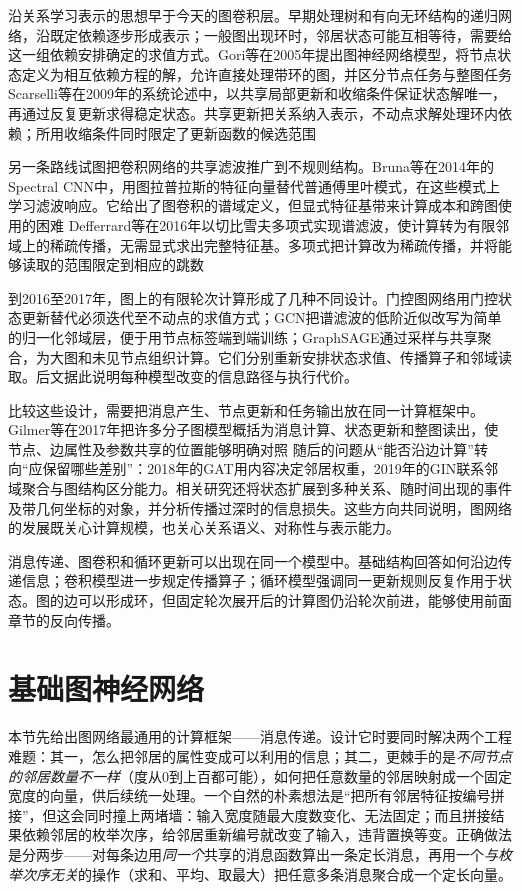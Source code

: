 沿关系学习表示的思想早于今天的图卷积层。早期处理树和有向无环结构的递归网络，沿既定依赖逐步形成表示；一般图出现环时，邻居状态可能互相等待，需要给这一组依赖安排确定的求值方式。Gori等在2005年提出图神经网络模型，将节点状态定义为相互依赖方程的解，允许直接处理带环的图，并区分节点任务与整图任务 Scarselli等在2009年的系统论述中，以共享局部更新和收缩条件保证状态解唯一，再通过反复更新求得稳定状态。共享更新把关系纳入表示，不动点求解处理环内依赖；所用收缩条件同时限定了更新函数的候选范围

另一条路线试图把卷积网络的共享滤波推广到不规则结构。Bruna等在2014年的Spectral CNN中，用图拉普拉斯的特征向量替代普通傅里叶模式，在这些模式上学习滤波响应。它给出了图卷积的谱域定义，但显式特征基带来计算成本和跨图使用的困难 Defferrard等在2016年以切比雪夫多项式实现谱滤波，使计算转为有限邻域上的稀疏传播，无需显式求出完整特征基。多项式把计算改为稀疏传播，并将能够读取的范围限定到相应的跳数

到2016至2017年，图上的有限轮次计算形成了几种不同设计。门控图网络用门控状态更新替代必须迭代至不动点的求值方式；GCN把谱滤波的低阶近似改写为简单的归一化邻域层，便于用节点标签端到端训练；GraphSAGE通过采样与共享聚合，为大图和未见节点组织计算。它们分别重新安排状态求值、传播算子和邻域读取。后文据此说明每种模型改变的信息路径与执行代价。

比较这些设计，需要把消息产生、节点更新和任务输出放在同一计算框架中。Gilmer等在2017年把许多分子图模型概括为消息计算、状态更新和整图读出，使节点、边属性及参数共享的位置能够明确对照 随后的问题从“能否沿边计算”转向“应保留哪些差别”：2018年的GAT用内容决定邻居权重，2019年的GIN联系邻域聚合与图结构区分能力。相关研究还将状态扩展到多种关系、随时间出现的事件及带几何坐标的对象，并分析传播过深时的信息损失。这些方向共同说明，图网络的发展既关心计算规模，也关心关系语义、对称性与表示能力。

消息传递、图卷积和循环更新可以出现在同一个模型中。基础结构回答如何沿边传递信息；卷积模型进一步规定传播算子；循环模型强调同一更新规则反复作用于状态。图的边可以形成环，但固定轮次展开后的计算图仍沿轮次前进，能够使用前面章节的反向传播。

\section{基础图神经网络}
\label{sec:gnn-basic}

本节先给出图网络最通用的计算框架——消息传递。设计它时要同时解决两个工程难题：其一，怎么把邻居的属性变成可以利用的信息；其二，更棘手的是\emph{不同节点的邻居数量不一样}（度从0到上百都可能），如何把任意数量的邻居映射成一个固定宽度的向量，供后续统一处理。一个自然的朴素想法是“把所有邻居特征按编号拼接”，但这会同时撞上两堵墙：输入宽度随最大度数变化、无法固定；而且拼接结果依赖邻居的枚举次序，给邻居重新编号就改变了输入，违背置换等变。正确做法是分两步——对每条边用\emph{同一个}共享的消息函数算出一条定长消息，再用一个\emph{与枚举次序无关}的操作（求和、平均、取最大）把任意多条消息聚合成一个定长向量。

